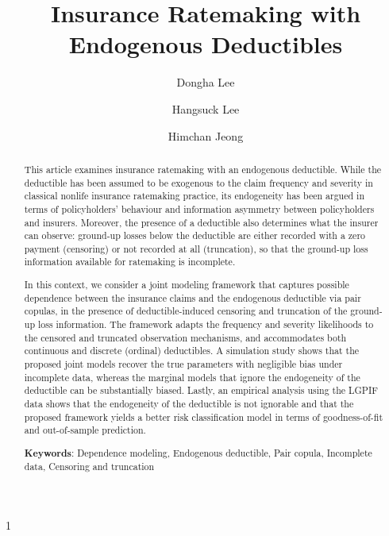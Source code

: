 \documentclass[11pt]{article}
\newcommand{\rev}[1]{{\color{blue}#1}}
\newcommand{\blind}{1}
\begin{document}
	\setlength{\abovedisplayskip}{6pt}
	\setlength{\belowdisplayskip}{6pt}
	\setlength{\abovedisplayshortskip}{6pt}
	\setlength{\belowdisplayshortskip}{6pt}	
\blind
{
	\title{Insurance Ratemaking with Endogenous Deductibles}	
\author[1]{Dongha Lee}
\author[2]{Hangsuck Lee}
\author[1,3,*]{Himchan Jeong}


	\date{}	
	\maketitle
} \fi


\begin{abstract}
\rev{This article examines insurance ratemaking with an endogenous deductible. While the deductible has been assumed to be exogenous to the claim frequency and severity in classical nonlife insurance ratemaking practice, its endogeneity has been argued in terms of policyholders' behaviour and information asymmetry between policyholders and insurers. Moreover, the presence of a deductible also determines what the insurer can observe: ground-up losses below the deductible are either recorded with a zero payment (censoring) or not recorded at all (truncation), so that the ground-up loss information available for ratemaking is incomplete.

In this context, we consider a joint modeling framework that captures possible dependence between the insurance claims and the endogenous deductible via pair copulas, in the presence of deductible-induced censoring and truncation of the ground-up loss information. The framework adapts the frequency and severity likelihoods to the censored and truncated observation mechanisms, and accommodates both continuous and discrete (ordinal) deductibles. A simulation study shows that the proposed joint models recover the true parameters with negligible bias under incomplete data, whereas the marginal models that ignore the endogeneity of the deductible can be substantially biased. Lastly, an empirical analysis using the LGPIF data shows that the endogeneity of the deductible is not ignorable and that the proposed framework yields a better risk classification model in terms of goodness-of-fit and out-of-sample prediction.}



\textbf{Keywords}: Dependence modeling, Endogenous deductible, Pair copula, Incomplete data, \rev{Censoring and truncation}

\end{abstract}
%
%
\end{document}
